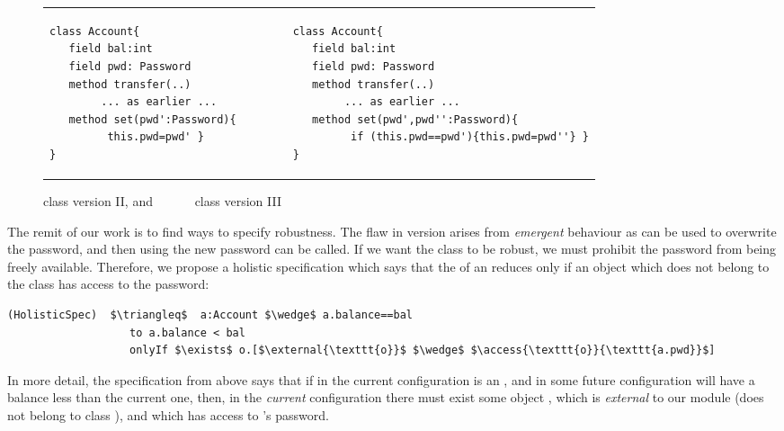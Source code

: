   
 
 \begin{figure}[hbtp]
 \begin{tabular}{lll}
\begin{minipage}{0.35\textwidth}
\begin{lstlisting}
class Account{
   field bal:int 
   field pwd: Password 
   method transfer(..) 
        ... as earlier ...
   method set(pwd':Password){
         this.pwd=pwd' }
}   
\end{lstlisting}
\end{minipage}
  &\ \ \  \ \   &
\begin{minipage}{0.50\textwidth}
\begin{lstlisting}
class Account{
   field bal:int 
   field pwd: Password 
   method transfer(..) 
        ... as earlier ...
   method set(pwd',pwd'':Password){
         if (this.pwd==pwd'){this.pwd=pwd''} }
}
\end{lstlisting}
\end{minipage} 
 \end{tabular}
  \caption{class  version II, and \ \ \ \ \ \  class  version III}
 \label{fig:ExampleAccount}
 \end{figure}

 
 The remit of our work is to find ways to specify robustness. 
 The flaw in version {} arises from \emph{emergent} behaviour as  
 can be used to overwrite the
 password, and then using the new password   can be called.
 If we want the  class to be robust, we must prohibit the password from being freely available.
 Therefore, we propose a holistic specification which says that
 the  of an  reduces only if an object which does not belong to the
 class  has access to the password:
 
 \begin{lstlisting}[language = Chainmail, mathescape=true, frame=lines]
(HolisticSpec)  $\triangleq$  a:Account $\wedge$ a.balance==bal
                   to a.balance < bal
                   onlyIf $\exists$ o.[$\external{\texttt{o}}$ $\wedge$ $\access{\texttt{o}}{\texttt{a.pwd}}$]
\end{lstlisting}
 
 
 In more detail, the specification from above says that if in the current
 configuration  is an ,
 and in some future configuration  will have a balance less than the current one, then, in the \emph{current} configuration
 there must exist some object , which is \emph{external} to our module (does not belong to class
 ), and which has access to 's password.
 
